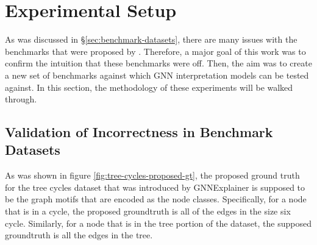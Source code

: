 \section{Experimental Setup}
\label{sec:exp-setup}
As was discussed in \S\ref{sec:benchmark-datasets}, there are many issues with the benchmarks that were proposed by \cite{yuan_explainability_2021}. Therefore, a major goal of this work was to confirm the intuition that these benchmarks were off. Then, the aim was to create a new set of benchmarks against which GNN interpretation models can be tested against. In this section, the methodology of these experiments will be walked through.

\subsection{Validation of Incorrectness in Benchmark Datasets}
As was shown in figure \ref{fig:tree-cycles-proposed-gt}, the proposed ground truth for the tree cycles dataset that was introduced by GNNExplainer is supposed to be the graph motifs that are encoded as the node classes. Specifically, for a node that is in a cycle, the proposed groundtruth is all of the edges in the size six cycle. Similarly, for a node that is in the tree portion of the dataset, the supposed groundtruth is all the edges in the tree. 

